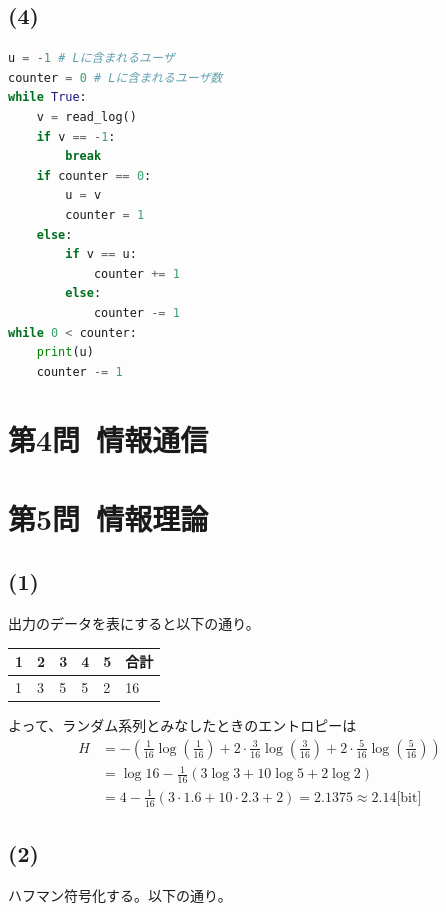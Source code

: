 \documentclass[a4paper,12pt,xelatex,ja=standard]{bxjsarticle}
\begin{document}
\subsection*{(4)}
\begin{lstlisting}[language=Python]
u = -1 # Lに含まれるユーザ
counter = 0 # Lに含まれるユーザ数
while True:
    v = read_log()
    if v == -1:
        break
    if counter == 0:
        u = v
        counter = 1
    else:
        if v == u:
            counter += 1
        else:
            counter -= 1
while 0 < counter:
    print(u)
    counter -= 1
\end{lstlisting}

\section*{第4問\ 情報通信}

\section*{第5問\ 情報理論}
\subsection*{(1)}
出力のデータを表にすると以下の通り。

\begin{table}[H]
  \centering
  \begin{tabular}{|l|l|l|l|l|l|}
  \hline
  1 & 2 & 3 & 4 & 5 & 合計 \\ \hline
  1 & 3 & 5 & 5 & 2 & 16 \\ \hline
  \end{tabular}
\end{table}

よって、ランダム系列とみなしたときのエントロピーは
\begin{equation*}
  \begin{split}
    H
      &= - (\frac{1}{16} \log (\frac{1}{16}) + 2 \cdot \frac{3}{16}\log (\frac{3}{16}) + 2 \cdot \frac{5}{16} \log (\frac{5}{16}))\\
      &= \log 16 - \frac{1}{16} (3 \log 3 + 10 \log 5 + 2 \log 2) \\
      &= 4 - \frac{1}{16}(3 \cdot 1.6 + 10 \cdot 2.3 + 2) = 2.1375 \approx 2.14 \text{[bit]}
  \end{split}
\end{equation*}

\subsection*{(2)}
ハフマン符号化する。以下の通り。
\end{document}
